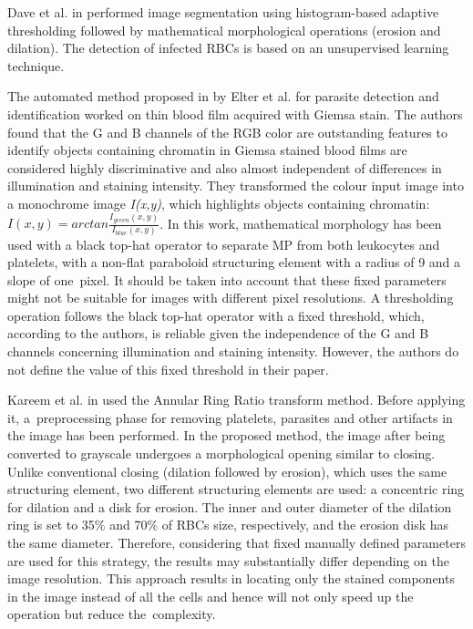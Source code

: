 Dave et al. in \cite{Dave2017} performed image segmentation using histogram-based adaptive thresholding followed by mathematical morphological operations (erosion and dilation). The detection of infected RBCs is based on an unsupervised learning technique.

The automated method proposed in \cite{Elter2011} by Elter et al. for parasite detection and identification worked on thin blood film acquired with Giemsa stain. The authors found that the G and B channels of the RGB color are outstanding features to identify objects containing chromatin in Giemsa stained blood films are considered highly discriminative and also almost independent of differences in illumination and staining intensity. They transformed the colour input image into a monochrome image \textit{I(x,y)}, which highlights objects containing chromatin: $ I(x,y) = arctan \frac{I_{green}(x,y)}{I_{blue}(x,y)} $. In this work, mathematical morphology has been used with a black top-hat operator to separate MP from both leukocytes and platelets, with a non-flat paraboloid structuring element with a radius of 9 and a slope of one~pixel. It should be taken into account that these fixed parameters might not be suitable for images with different pixel resolutions. A thresholding operation follows the black top-hat operator with a fixed threshold, which, according to the authors, is reliable given the independence of the G and B channels concerning illumination and staining intensity. However, the authors do not define the value of this fixed threshold in their paper.

Kareem et al. in \cite{Kareem2011} used the Annular Ring Ratio transform method. Before applying it, a~preprocessing phase for removing platelets, parasites and other artifacts in the image has been performed. In the proposed method, the image after being converted to grayscale undergoes a morphological opening similar to closing. Unlike conventional closing (dilation followed by erosion), which uses the same structuring element, two different structuring elements are used: a concentric ring for dilation and a disk for erosion. The inner and outer diameter of the dilation ring is set to 35\% and 70\% of RBCs size, respectively, and the erosion disk has the same diameter. Therefore, considering that fixed manually defined parameters are used for this strategy, the results may substantially differ depending on the image resolution. This approach results in locating only the stained components in the image instead of all the cells and hence will not only speed up the operation but reduce the~complexity.

